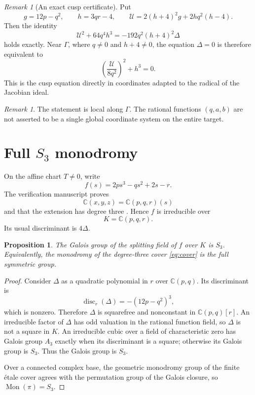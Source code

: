 \documentclass[11pt,reqno]{amsart}
\numberwithin{equation}{section}
\newtheorem{proposition}[theorem]{Proposition}
\theoremstyle{remark}
\newtheorem{remark}[theorem]{Remark}
\newcommand{\C}{\mathbb C}
\newcommand{\Mon}{\operatorname{Mon}}
\begin{document}
\begin{remark}[An exact cusp certificate]\label{rem:certificate}
Put
\[
g=12p-q^2,
\qquad
h=3qr-4,
\qquad
\mathcal U=2(h+4)^2g+2hq^2(h-4).
\]
Then the identity
\begin{equation}\label{eq:cusp-certificate}
\mathcal U^2+64q^4h^3
=-192q^2(h+4)^2\Delta
\end{equation}
holds exactly. Near $\Gamma$, where $q\neq0$ and $h+4\neq0$, the equation $\Delta=0$ is therefore equivalent to
\[
\left(\frac{\mathcal U}{8q^2}\right)^2+h^3=0.
\]
This is the cusp equation directly in coordinates adapted to the radical of the Jacobian ideal.
\end{remark}

\begin{remark}
The statement is local along $\Gamma$. The rational functions $(q,a,b)$ are not asserted to be a single global coordinate system on the entire target.
\end{remark}

\section{Full \texorpdfstring{$S_3$}{S3} monodromy}

On the affine chart $T\neq0$, write
\begin{equation}\label{eq:affine-cubic}
f(s)=2ps^3-qs^2+2s-r.
\end{equation}
The verification manuscript proves
\[
\C(x,y,z)=\C(p,q,r)(s)
\]
and that the extension has degree three \cite[Remark~4.4]{Counterexample2026}. Hence $f$ is irreducible over
\[
K=\C(p,q,r).
\]
Its usual discriminant is $4\Delta$.

\begin{proposition}\label{prop:S3}
The Galois group of the splitting field of $f$ over $K$ is $S_3$. Equivalently, the monodromy of the degree-three cover \eqref{eq:cover} is the full symmetric group.
\end{proposition}

\begin{proof}
Consider $\Delta$ as a quadratic polynomial in $r$ over $\C(p,q)$. Its discriminant is
\begin{equation}\label{eq:disc-r}
\operatorname{disc}_r(\Delta)=-(12p-q^2)^3,
\end{equation}
which is nonzero. Therefore $\Delta$ is squarefree and nonconstant in $\C(p,q)[r]$. An irreducible factor of $\Delta$ has odd valuation in the rational function field, so $\Delta$ is not a square in $K$. An irreducible cubic over a field of characteristic zero has Galois group $A_3$ exactly when its discriminant is a square; otherwise its Galois group is $S_3$. Thus the Galois group is $S_3$.

Over a connected complex base, the geometric monodromy group of the finite étale cover agrees with the permutation group of the Galois closure, so $\Mon(\pi)=S_3$.
\end{proof}
\end{document}
